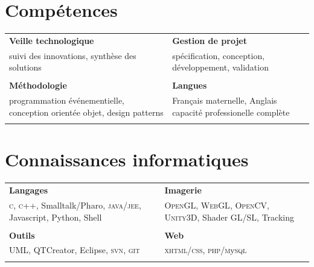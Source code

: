\documentclass[9pt]{article}
\begin{document}
\hspace{-20pt}
\begin{minipage}[t]{0.47\textwidth}
	\vspace{-67pt} %
\section{Comp\'etences}
	\begin{tabular}{p{}p{}}
		\textbf{\small Veille technologique} & \textbf{\small Gestion de projet} \\
		{\small suivi des innovations, synth\`ese des solutions} & 
		{\small sp\'ecification, conception, d\'eveloppement, validation} \\ & \\
	
		\textbf{\small M\'ethodologie} & \textbf{\small Langues} \\
		{\small programmation \'ev\'enementielle, conception orient\'ee objet, design patterns} & 
		{\small Fran\c cais maternelle, Anglais capacit\'e professionelle compl\`ete} \\ & \\
	
	\end{tabular}
\end{minipage} %
\hspace{15pt}
\begin{minipage}{0.45\textwidth}
	
\section{Connaissances informatiques}
\begin{tabular}{p{}p{}}
	\textbf{\small Langages} & \textbf{\small Imagerie} \\
	{\small \textsc{c},  \textsc{c++}, Smalltalk/Pharo, \textsc{java/jee}, Javascript, Python, Shell} & 
	{\small \textsc{OpenGL}, \textsc{WebGL}, \textsc{OpenCV}, \textsc{Unity3D}, Shader \textsc{GL/SL}, Tracking}	 \\ & \\

	\textbf{\small Outils} & \textbf{\small Web} \\
	{\small \textsc{UML}, QTCreator, Eclipse, \textsc{svn}, \textsc{git}} & 
	{\small \textsc{xhtml/css}, \textsc{php}/\textsc{m}y\textsc{sql}} \\ & 
	

\end{tabular}
\end{minipage} %
\end{document}
